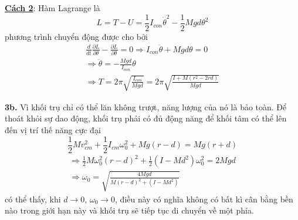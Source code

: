 \noindent\underline{\textbf{Cách 2}}: Hàm Lagrange là
\begin{equation*}
  L=T-U=\frac{1}{2}I_{con}\dot{\theta}^2-\frac{1}{2}Mgd\theta^2
\end{equation*}
phương trình chuyển động được cho bởi
\begin{equation*}
  \begin{gathered}
    \frac{d}{dt}\frac{\partial L}{\partial\theta}-\frac{\partial L}{\partial\theta}=0\Rightarrow I_{con}\ddot{\theta}+Mgd\theta=0 \\
    \Rightarrow\ddot{\theta}=-\frac{Mgd}{I_{con}}\theta                                                                           \\
    \Rightarrow T=2\pi\sqrt{\frac{I_{con}}{Mgd}}=2\pi\sqrt{\frac{I+M(r^{2}-2rd)}{Mgd}}
  \end{gathered}
\end{equation*}

\noindent\textbf{3b.} Vì khối trụ chỉ có thể lăn không trượt, năng lượng của nó là bảo toàn. Để thoát khỏi sự dao động, khối trụ phải có đủ động năng để khối tâm có thể lên đến vị trí thế năng cực đại
\begin{equation*}
  \frac{1}{2}Mv_{cm}^{2}+\frac{1}{2}I_{cm}\omega_{0}^{2}+Mg(r-d)=Mg(r+d)
\end{equation*}
\begin{equation*}
  \begin{gathered}
    \Rightarrow\frac{1}{2}M\omega_{0}^{2}(r-d)^{2}+\frac{1}{2}(I-Md^{2})\omega_{0}^{2}=2Mgd \\
    \Rightarrow\omega_{0}=\sqrt{\frac{4Mgd}{M(r-d)^{2}+(I-Md^{2})}}
  \end{gathered}
\end{equation*}
có thể thấy, khi $d\rightarrow0$, $\omega_0\rightarrow0$, điều này có nghĩa không có bất kì cân bằng bền nào trong giới hạn này và khối trụ sẽ tiếp tục di chuyển về một phía.\\